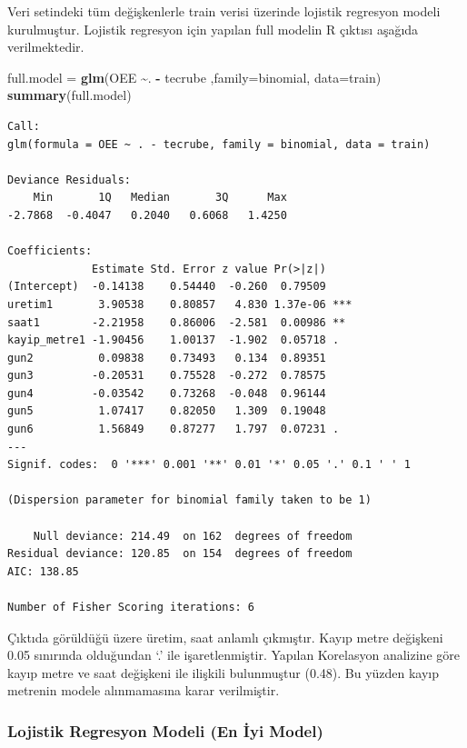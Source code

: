 \documentclass[12pt,twoside]{deuthesis}
\newenvironment{Shaded}{\begin{snugshade}}{\end{snugshade}}
\newcommand{\DataTypeTok}[1]{\textcolor[rgb]{0.13,0.29,0.53}{#1}}
\newcommand{\KeywordTok}[1]{\textcolor[rgb]{0.13,0.29,0.53}{\textbf{#1}}}
\newcommand{\NormalTok}[1]{#1}
\newcommand{\OperatorTok}[1]{\textcolor[rgb]{0.81,0.36,0.00}{\textbf{#1}}}
\newcommand{\StringTok}[1]{\textcolor[rgb]{0.31,0.60,0.02}{#1}}
\begin{document}
Veri setindeki tüm değişkenlerle train verisi üzerinde lojistik regresyon modeli kurulmuştur. Lojistik regresyon için yapılan full modelin R çıktısı aşağıda verilmektedir.
\begin{Shaded}
\begin{Highlighting}[]
\NormalTok{full.model =}\StringTok{ }\KeywordTok{glm}\NormalTok{(OEE }\OperatorTok{\textasciitilde{}}\NormalTok{. }\OperatorTok{{-}}\StringTok{ }\NormalTok{tecrube ,}\DataTypeTok{family=}\NormalTok{binomial, }\DataTypeTok{data=}\NormalTok{train)}
\KeywordTok{summary}\NormalTok{(full.model)}
\end{Highlighting}
\end{Shaded}
\begin{verbatim}
Call:
glm(formula = OEE ~ . - tecrube, family = binomial, data = train)

Deviance Residuals: 
    Min       1Q   Median       3Q      Max  
-2.7868  -0.4047   0.2040   0.6068   1.4250  

Coefficients:
             Estimate Std. Error z value Pr(>|z|)    
(Intercept)  -0.14138    0.54440  -0.260  0.79509    
uretim1       3.90538    0.80857   4.830 1.37e-06 ***
saat1        -2.21958    0.86006  -2.581  0.00986 ** 
kayip_metre1 -1.90456    1.00137  -1.902  0.05718 .  
gun2          0.09838    0.73493   0.134  0.89351    
gun3         -0.20531    0.75528  -0.272  0.78575    
gun4         -0.03542    0.73268  -0.048  0.96144    
gun5          1.07417    0.82050   1.309  0.19048    
gun6          1.56849    0.87277   1.797  0.07231 .  
---
Signif. codes:  0 '***' 0.001 '**' 0.01 '*' 0.05 '.' 0.1 ' ' 1

(Dispersion parameter for binomial family taken to be 1)

    Null deviance: 214.49  on 162  degrees of freedom
Residual deviance: 120.85  on 154  degrees of freedom
AIC: 138.85

Number of Fisher Scoring iterations: 6
\end{verbatim}
Çıktıda görüldüğü üzere üretim, saat anlamlı çıkmıştır. Kayıp metre değişkeni 0.05 sınırında olduğundan `.' ile işaretlenmiştir.
Yapılan Korelasyon analizine göre kayıp metre ve saat değişkeni ile ilişkili bulunmuştur (0.48). Bu yüzden kayıp metrenin modele alınmamasına karar verilmiştir.

\hypertarget{lojistik-regresyon-modeli-en-iux307yi-model}{%
\subsubsection{Lojistik Regresyon Modeli (En İyi Model)}\label{lojistik-regresyon-modeli-en-iux307yi-model}}
\end{document}
